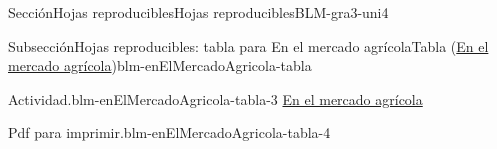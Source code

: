 \documentclass[oneside,10pt,]{article}
\begin{document}
\begin{sectionptx}{Sección}{Hojas reproducibles}{}{Hojas reproducibles}{}{}{BLM-gra3-uni4}
\typeout{************************************************}
%
\begin{spanish}
\begin{subsectionptx}{Subsección}{Hojas reproducibles: tabla para En el mercado agrícola}{}{Tabla (\hyperref[act-enElMercadoAgricola]{En el mercado agrícola})}{}{}{blm-enElMercadoAgricola-tabla}
\begin{paragraphs}{Actividad.}{blm-enElMercadoAgricola-tabla-3}%
\hyperref[act-enElMercadoAgricola]{En el mercado agrícola}%
\end{paragraphs}%
\begin{paragraphs}{Pdf para imprimir.}{blm-enElMercadoAgricola-tabla-4}%
%
\end{paragraphs}%
\end{subsectionptx}
\end{spanish}
\end{sectionptx}
%
%
\typeout{************************************************}
\typeout{************************************************}
%
\end{document}
